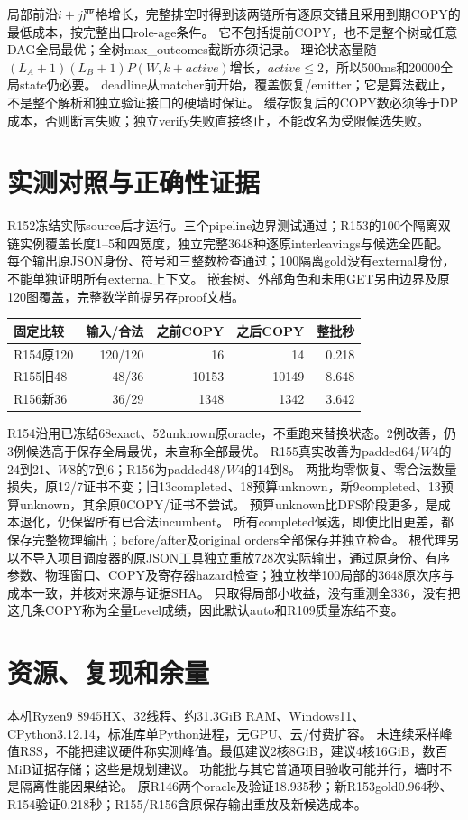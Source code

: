 \documentclass[UTF8,11pt,a4paper]{ctexart}
\begin{document}
局部前沿$i+j$严格增长，完整排空时得到该两链所有逐原交错且采用到期COPY的最低成本，按完整出口role-age条件。
它不包括提前COPY，也不是整个树或任意DAG全局最优；全树max\_outcomes截断亦须记录。
理论状态量随$(L_A+1)(L_B+1)P(W,k+active)$增长，$active\le2$，所以500ms和20000全局state仍必要。
deadline从matcher前开始，覆盖恢复/emitter；它是算法截止，不是整个解析和独立验证接口的硬墙时保证。
缓存恢复后的COPY数必须等于DP成本，否则断言失败；独立verify失败直接终止，不能改名为受限候选失败。

\section{实测对照与正确性证据}
R152冻结实际source后才运行。三个pipeline边界测试通过；R153的100个隔离双链实例覆盖长度1--5和四宽度，独立完整3648种逐原interleavings与候选全匹配。
每个输出原JSON身份、符号和三整数检查通过；100隔离gold没有external身份，不能单独证明所有external上下文。
嵌套树、外部角色和未用GET另由边界及原120图覆盖，完整数学前提另存proof文档。

\begin{center}\small
\begin{tabular}{lrrrr}
\toprule
固定比较&输入/合法&之前COPY&之后COPY&整批秒\\
\midrule
R154原120&120/120&16&14&0.218\\
R155旧48&48/36&10153&10149&8.648\\
R156新36&36/29&1348&1342&3.642\\
\bottomrule
\end{tabular}
\end{center}
R154沿用已冻结68exact、52unknown原oracle，不重跑来替换状态。2例改善，仍3例候选高于保存全局最优，未宣称全部最优。
R155真实改善为padded64/$W4$的24到21、$W8$的7到6；R156为padded48/$W4$的14到8。
两批均零恢复、零合法数量损失，原12/7证书不变；旧13completed、18预算unknown，新9completed、13预算unknown，其余原0COPY/证书不尝试。
预算unknown比DFS阶段更多，是成本退化，仍保留所有已合法incumbent。
所有completed候选，即使比旧更差，都保存完整物理输出；before/after及original orders全部保存并独立检查。
根代理另以不导入项目调度器的原JSON工具独立重放728次实际输出，通过原身份、有序参数、物理窗口、COPY及寄存器hazard检查；独立枚举100局部的3648原次序与成本一致，并核对来源与证据SHA。
只取得局部小收益，没有重测全336，没有把这几条COPY称为全量Level成绩，因此默认auto和R109质量冻结不变。

\section{资源、复现和余量}
本机Ryzen9 8945HX、32线程、约31.3GiB RAM、Windows11、CPython3.12.14，标准库单Python进程，无GPU、云/付费扩容。
未连续采样峰值RSS，不能把建议硬件称实测峰值。最低建议2核8GiB，建议4核16GiB，数百MiB证据存储；这些是规划建议。
功能批与其它普通项目验收可能并行，墙时不是隔离性能因果结论。
原R146两个oracle及验证18.935秒；新R153gold0.964秒、R154验证0.218秒；R155/R156含原保存输出重放及新候选成本。
\end{document}
